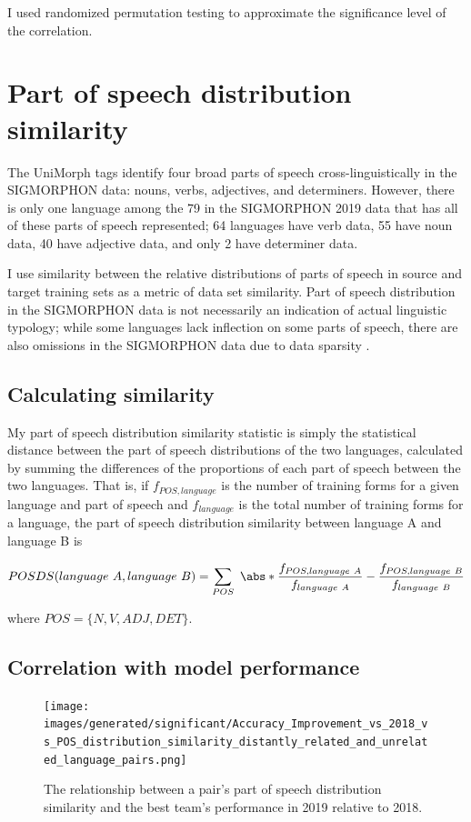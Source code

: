 I used randomized permutation testing to approximate the significance level of the correlation.

\section{Part of speech distribution similarity}

The UniMorph tags identify four broad parts of speech cross-linguistically in the SIGMORPHON data: nouns, verbs, adjectives, and determiners. However, there is only one language among the 79 in the SIGMORPHON 2019 data that has all of these parts of speech represented; 64 languages have verb data, 55 have noun data, 40 have adjective data, and only 2 have determiner data. 

I use similarity between the relative distributions of parts of speech in source and target training sets as a metric of data set similarity. Part of speech distribution in the SIGMORPHON data is not necessarily an indication of actual linguistic typology; while some languages lack inflection on some parts of speech, there are also omissions in the SIGMORPHON data due to data sparsity \parencite{Cotterell2018b}.

\subsection{Calculating similarity}

My part of speech distribution similarity statistic is simply the statistical distance between the part of speech distributions of the two languages, calculated by summing the differences of the proportions of each part of speech between the two languages. That is, if $f_{POS, language}$ is the number of training forms for a given language and part of speech and $f_{language}$ is the total number of training forms for a language, the part of speech distribution similarity between language A and language B is

\[POSDS(language\ A, language\ B) = \sum\limits_{POS}\ \abs*{\frac{f_{POS, language\ A}}{f_{language\ A}} - \frac{f_{POS, language\ B}}{f_{language\ B}}}\]

where $POS = \{N, V, ADJ, DET\}$.

\subsection{Correlation with model performance}

\begin{figure}[ht]
\texttt{[image: images/generated/significant/Accuracy\_Improvement\_vs\_2018\_vs\_POS\_distribution\_similarity\_distantly\_related\_and\_unrelated\_language\_pairs.png]}
\centering
\caption{The relationship between a pair's part of speech distribution similarity and the best team's performance in 2019 relative to 2018.}
\end{figure}


